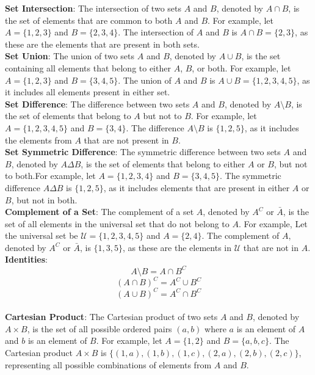 \documentclass{article}
\begin{document}
\textbf{Set Intersection}: The intersection of two sets $A$ and $B$, denoted by $A \cap B$, is the set of elements that are common to both $A$ and $B$. For example, let $A = \{1, 2, 3\}$ and $B = \{2, 3, 4\}$. The intersection of $A$ and $B$ is $A \cap B = \{2, 3\}$, as these are the elements that are present in both sets.\\
\textbf{Set Union}: The union of two sets $A$ and $B$, denoted by $A \cup B$, is the set containing all elements that belong to either $A$, $B$, or both.
For example, let $A = \{1, 2, 3\}$ and $B = \{3, 4, 5\}$. The union of $A$ and $B$ is $A \cup B = \{1, 2, 3, 4, 5\}$, as it includes all elements present in either set.\\
\textbf{Set Difference}: The difference between two sets $A$ and $B$, denoted by $A \setminus B$, is the set of elements that belong to $A$ but not to $B$.
For example, let $A = \{1, 2, 3, 4, 5\}$ and $B = \{3, 4\}$. The difference $A \setminus B$ is $\{1, 2, 5\}$, as it includes the elements from $A$ that are not present in $B$.\\
\textbf{Set Symmetric Difference}: The symmetric difference between two sets $A$ and $B$, denoted by $A \Delta B$, is the set of elements that belong to either $A$ or $B$, but not to both.For example, let $A = \{1, 2, 3, 4\}$ and $B = \{3, 4, 5\}$. The symmetric difference $A \Delta B$ is $\{1, 2, 5\}$, as it includes elements that are present in either $A$ or $B$, but not in both.\\
\textbf{Complement of a Set}: The complement of a set $A$, denoted by $A^C$ or $\bar{A}$, is the set of all elements in the universal set that do not belong to $A$.
For example, Let the universal set be $\mathcal{U} = \{1, 2, 3, 4, 5\}$ and $A = \{2, 4\}$. The complement of $A$, denoted by $A^C$ or $\bar{A}$, is $\{1, 3, 5\}$, as these are the elements in $\mathcal{U}$ that are not in $A$.\\
\textbf{Identities}: 
\[A \setminus B = A \cap B^C\]
\[(A \cap B)^C = A^C \cup B^C\]
\[(A \cup B)^C = A^C \cap B^C\]
\\
\textbf{Cartesian Product}: The Cartesian product of two sets $A$ and $B$, denoted by $A \times B$, is the set of all possible ordered pairs $(a, b)$ where $a$ is an element of $A$ and $b$ is an element of $B$. For example, let $A = \{1, 2\}$ and $B = \{a, b, c\}$. The Cartesian product $A \times B$ is $\{(1, a), (1, b), (1, c), (2, a), (2, b), (2, c)\}$, representing all possible combinations of elements from $A$ and $B$.
\end{document}
